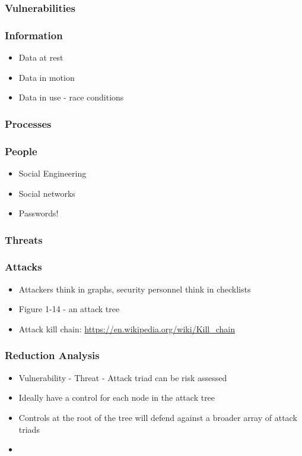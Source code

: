 \documentclass[11pt]{article}
\begin{document}
\subsubsection{Vulnerabilities}
\label{sec:org7918767}
\subsubsection{Information}
\label{sec:orgcfc8191}
\begin{itemize}
\item Data at rest
\item Data in motion
\item Data in use - race conditions
\end{itemize}
\subsubsection{Processes}
\label{sec:org62cc31f}
\subsubsection{People}
\label{sec:org9ff7cac}
\begin{itemize}
\item Social Engineering
\item Social networks
\item Passwords!
\end{itemize}
\subsubsection{Threats}
\label{sec:org6c7b7c7}
\subsubsection{Attacks}
\label{sec:orgb2612d4}
\begin{itemize}
\item Attackers think in graphs, security personnel think in checklists
\item Figure 1-14 - an attack tree
\item Attack kill chain: \url{https://en.wikipedia.org/wiki/Kill\_chain}
\end{itemize}
\subsubsection{Reduction Analysis}
\label{sec:org036b001}
\begin{itemize}
\item Vulnerability - Threat - Attack triad can be risk assessed
\item Ideally have a control for each node in the attack tree
\item Controls at the root of the tree will defend against a broader array of attack triads
\item 
\end{itemize}
\end{document}
